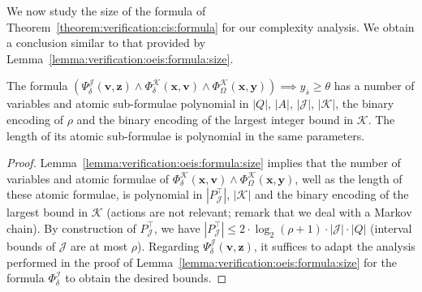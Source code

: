 \documentclass[a4paper,UKenglish,cleveref,autoref,thm-restate,colorlinks]{lipics-v2021}
\newcommand{\ocStateSpace}{Q}
\newcommand{\ocConfig}{s}
\newcommand{\ocActionSpace}{A}
\newcommand{\ocTrans}{\delta}
\newcommand{\period}{\rho}
\newcommand{\intPart}{\mathcal{I}}
\newcommand{\intPartB}{\mathcal{J}}
\newcommand{\intPartC}{\mathcal{K}}
\newcommand{\cisChainStateSpaceStar}{P_{\intPartB}^{\top}}
\newcommand{\cisConfig}{\bar{\ocConfig}}
\newcommand{\varTrans}{x}
\newcommand{\varTransTuple}{\mathbf{\varTrans}}
\newcommand{\varObj}{y}
\newcommand{\varObjTuple}{\mathbf{\varObj}}
\newcommand{\varStrat}{z}
\newcommand{\varStratTuple}{\mathbf{\varStrat}}
\newcommand{\varCis}{v}
\newcommand{\varCisTuple}{\mathbf{\varCis}}
\newcommand{\formulaTransBase}{\Phi_{\ocTrans}}
\newcommand{\formulaObjBase}{\Phi_{\objective}}
\newcommand{\formulaCisBase}{\Psi_{\ocTrans}}
\newcommand{\formulaTrans}{\formulaTransBase^\intPart}
\newcommand{\formulaCis}{\formulaCisBase^\intPartB}
\newcommand{\formulaCisTrans}{\formulaTransBase^\intPartC}
\newcommand{\formulaCisObj}{\formulaObjBase^\intPartC}
\newcommand{\objective}{\Omega}
\newcommand{\thresProba}{\theta}
\begin{document}
We now study the size of the formula of Theorem~\ref{theorem:verification:cis:formula} for our complexity analysis.
We obtain a conclusion similar to that provided by Lemma~\ref{lemma:verification:oeis:formula:size}.
\begin{lemma}\label{lemma:verification:cis:formula:size}
  The formula $(\formulaCis(\varCisTuple, \varStratTuple)\land\formulaCisTrans(\varTransTuple,\varCisTuple)\land\formulaCisObj(\varTransTuple, \varObjTuple))\implies \varObj_{\cisConfig}\geq\thresProba$ has a number of variables and atomic sub-formulae polynomial in $|\ocStateSpace|$, $|\ocActionSpace|$, $|\intPartB|$, $|\intPartC|$, the binary encoding of $\period$ and the binary encoding of the largest integer bound in $\intPartC$.
    The length of its atomic sub-formulae is polynomial in the same parameters.
\end{lemma}
\begin{proof}
  Lemma~\ref{lemma:verification:oeis:formula:size} implies that the number of variables and atomic formulae of $\formulaCisTrans(\varTransTuple,\varCisTuple)\land\formulaCisObj(\varTransTuple, \varObjTuple)$, well as the length of these atomic formulae, is polynomial in $|\cisChainStateSpaceStar|$, $|\intPartC|$ and the binary encoding of the largest bound in $\intPartC$ (actions are not relevant; remark that we deal with a Markov chain).
  By construction of $\cisChainStateSpaceStar$, we have $|\cisChainStateSpaceStar|\leq2\cdot\log_2(\period+1)\cdot|\intPartB|\cdot|\ocStateSpace|$ (interval bounds of $\intPartB$ are at most $\period$).
  Regarding $\formulaCis(\varCisTuple, \varStratTuple)$, it suffices to adapt the analysis performed in the proof of Lemma~\ref{lemma:verification:oeis:formula:size} for the formula $\formulaTrans$ to obtain the desired bounds.
\end{proof}
\end{document}
